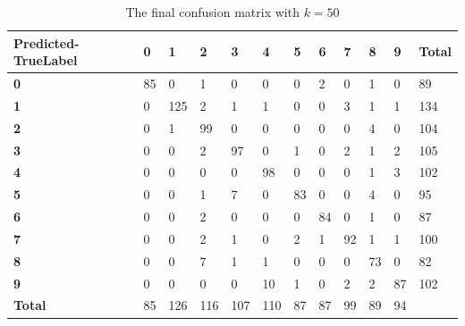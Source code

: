 \begin{table}[]
  \centering
\caption{The final confusion matrix with $k = 50$}
\label{confusion_matrix_50}
\begin{tabular}{|l|l|l|l|l|l|l|l|l|l|l|l|}
\hline
\textbf{Predicted-TrueLabel} & \textbf{0} & \textbf{1} & \textbf{2} & \textbf{3} & \textbf{4} & \textbf{5} & \textbf{6} & \textbf{7} & \textbf{8} & \textbf{9} & \textbf{Total} \\ \hline
\textbf{0}                   & 85         & 0          & 1          & 0          & 0          & 0          & 2          & 0          & 1          & 0          & 89             \\ \hline
\textbf{1}                   & 0          & 125        & 2          & 1          & 1          & 0          & 0          & 3          & 1          & 1          & 134            \\ \hline
\textbf{2}                   & 0          & 1          & 99         & 0          & 0          & 0          & 0          & 0          & 4          & 0          & 104            \\ \hline
\textbf{3}                   & 0          & 0          & 2          & 97         & 0          & 1          & 0          & 2          & 1          & 2          & 105            \\ \hline
\textbf{4}                   & 0          & 0          & 0          & 0          & 98         & 0          & 0          & 0          & 1          & 3          & 102            \\ \hline
\textbf{5}                   & 0          & 0          & 1          & 7          & 0          & 83         & 0          & 0          & 4          & 0          & 95             \\ \hline
\textbf{6}                   & 0          & 0          & 2          & 0          & 0          & 0          & 84         & 0          & 1          & 0          & 87             \\ \hline
\textbf{7}                   & 0          & 0          & 2          & 1          & 0          & 2          & 1          & 92         & 1          & 1          & 100            \\ \hline
\textbf{8}                   & 0          & 0          & 7          & 1          & 1          & 0          & 0          & 0          & 73         & 0          & 82             \\ \hline
\textbf{9}                   & 0          & 0          & 0          & 0          & 10         & 1          & 0          & 2          & 2          & 87         & 102            \\ \hline
\textbf{Total}               & 85         & 126        & 116        & 107        & 110        & 87         & 87         & 99         & 89         & 94         &                \\ \hline
\end{tabular}
\end{table}

